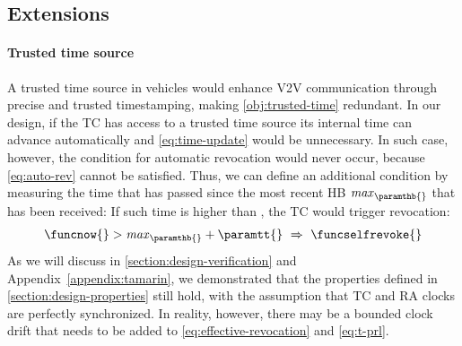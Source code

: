 \subsection{Extensions}
\label{section:design-extensions}

\paragraph{Trusted time source}
%
A trusted time source in vehicles would enhance \ac{V2V} communication through
precise and trusted timestamping, making \ref{obj:trusted-time} redundant. In
our design, if the \ac{TC} has access to a trusted time source its internal time
can advance automatically and \cref{eq:time-update} would be unnecessary. In
such case, however, the condition for automatic revocation would never occur,
because \cref{eq:auto-rev} cannot be satisfied. Thus, we can define an
additional condition by measuring the time that has passed since the most recent
\ac{HB} $\mathit{max}_{\paramthb{}}$ that has been received: If such time is
higher than \paramtt, the \ac{TC} would trigger revocation:
%
\begin{equation}
    \label{eq:auto-rev-timeout}
    \funcnow{} > \mathit{max}_{\paramthb{}} + \paramtt{} \ \Rightarrow\  \funcselfrevoke{}
\end{equation}
%
As we will discuss in \cref{section:design-verification} and
Appendix~\ref{appendix:tamarin}, we demonstrated that the properties defined in
\cref{section:design-properties} still hold, with the assumption that \ac{TC}
and \ac{RA} clocks are perfectly synchronized. In reality, however, there may be
a bounded clock drift \paramtd{} that needs to be added to
\cref{eq:effective-revocation} and \cref{eq:t-prl}. 

